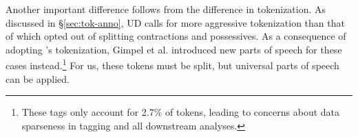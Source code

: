 \documentclass[11pt,a4paper]{article}
\begin{document}
Another important difference follows from the difference in
tokenization.  As discussed in \S\ref{sec:tok-anno}, UD calls for more
aggressive tokenization than that of \citet{ICWSM101540} which opted
out of splitting contractions and possessives. As a consequence of adopting \citet{ICWSM101540}'s tokenization, 
Gimpel et al. introduced new parts of speech for these cases
instead.\footnote{These tags only account for 2.7\% of tokens,
  leading to concerns about data sparseness in tagging and all
  downstream analyses.}  For us, these tokens must be split, but
universal parts of speech can be applied.

\end{document}
